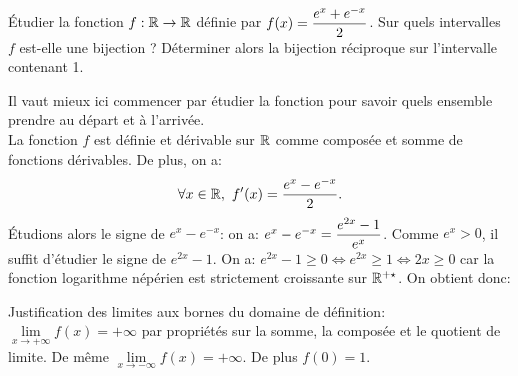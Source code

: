 \documentclass[a4paper, 11pt,reqno]{article}
\begin{document}
\begin{exercice}  \;
	\'Etudier la fonction $f:\mathbb{R}\rightarrow \mathbb{R}$ d\'efinie par $f(x)=\displaystyle\frac{e^x +e^{-x}}{2}$. Sur quels intervalles $f$ est-elle une bijection ? D\'eterminer alors la bijection r\'eciproque sur l'intervalle contenant 1.
\end{exercice}
\begin{correction} \;
	Il vaut mieux ici commencer par \'etudier la fonction pour savoir quels ensemble prendre au d\'epart et \`a l'arriv\'ee.\\
	La fonction $f$ est d\'efinie et d\'erivable sur $\mathbb{R}$ comme compos\'ee et somme de fonctions d\'erivables. De plus, on a:
	$$\forall x\in\R,\ f^{\prime}(x)=\ddp\frac{e^x-e^{-x}}{2}.$$
	\'Etudions alors le signe de $e^x-e^{-x}$: on a: $e^x-e^{-x}=\displaystyle\frac{e^{2x}-1}{e^x}$. Comme $e^x>0$, il suffit d'\'etudier le signe de $e^{2x}-1$. On a: $e^{2x}-1\geq 0\Leftrightarrow e^{2x}\geq 1\Leftrightarrow 2x\geq 0$ car la fonction logarithme n\'ep\'erien est strictement croissante sur $\mathbb{R}^{+\star}$. On obtient donc:
	\begin{center}
	\end{center}
	Justification des limites aux bornes du domaine de d\'efinition:
	\noindent $\lim\limits_{x\to +\infty} f(x)=+\infty$ par propri\'et\'es sur la somme, la compos\'ee et le quotient de limite. De m\^{e}me $\lim\limits_{x\to -\infty} f(x)=+\infty$. De plus $f(0)=1$.\\

\end{correction}
\end{document}
